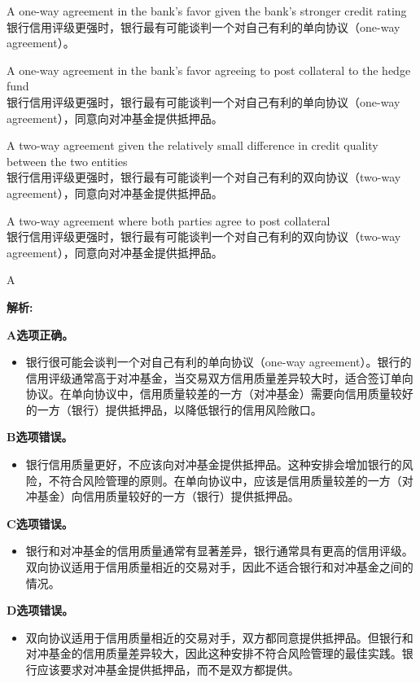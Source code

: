 \documentclass{article}
\newenvironment{explanation}
{\textbf{解析:}\par}
{\par}
\begin{document}
\begin{choices}
    \item A one-way agreement in the bank's favor given the bank's stronger credit rating\\
    银行信用评级更强时，银行最有可能谈判一个对自己有利的单向协议（one-way agreement）。
    \item A one-way agreement in the bank's favor agreeing to post collateral to the hedge fund\\
    银行信用评级更强时，银行最有可能谈判一个对自己有利的单向协议（one-way agreement），同意向对冲基金提供抵押品。
    \item A two-way agreement given the relatively small difference in credit quality between the two entities\\
    银行信用评级更强时，银行最有可能谈判一个对自己有利的双向协议（two-way agreement），同意向对冲基金提供抵押品。
    \item A two-way agreement where both parties agree to post collateral\\
    银行信用评级更强时，银行最有可能谈判一个对自己有利的双向协议（two-way agreement），同意向对冲基金提供抵押品。
\end{choices}

\begin{correctanswer}
    A
\end{correctanswer}

\begin{explanation}

    \textbf{A选项正确。}
    \begin{itemize}
        \item 银行很可能会谈判一个对自己有利的单向协议（one-way agreement）。银行的信用评级通常高于对冲基金，当交易双方信用质量差异较大时，适合签订单向协议。在单向协议中，信用质量较差的一方（对冲基金）需要向信用质量较好的一方（银行）提供抵押品，以降低银行的信用风险敞口。
    \end{itemize}

    \textbf{B选项错误。}
    \begin{itemize}
        \item 银行信用质量更好，不应该向对冲基金提供抵押品。这种安排会增加银行的风险，不符合风险管理的原则。在单向协议中，应该是信用质量较差的一方（对冲基金）向信用质量较好的一方（银行）提供抵押品。
    \end{itemize}

    \textbf{C选项错误。}
    \begin{itemize}
        \item 银行和对冲基金的信用质量通常有显著差异，银行通常具有更高的信用评级。双向协议适用于信用质量相近的交易对手，因此不适合银行和对冲基金之间的情况。
    \end{itemize}

    \textbf{D选项错误。}
    \begin{itemize}
        \item 双向协议适用于信用质量相近的交易对手，双方都同意提供抵押品。但银行和对冲基金的信用质量差异较大，因此这种安排不符合风险管理的最佳实践。银行应该要求对冲基金提供抵押品，而不是双方都提供。
    \end{itemize}

\end{explanation}
\end{document}
